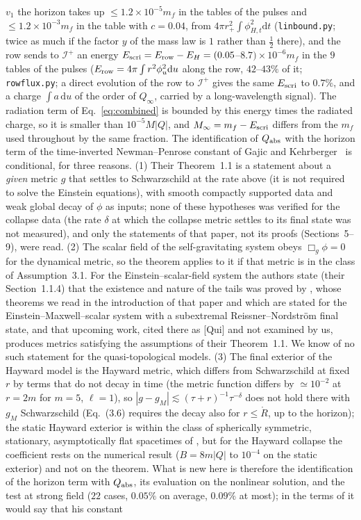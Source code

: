 \documentclass[11pt]{article}
\begin{document}
$v_1$ the horizon takes up $\le1.2\times10^{-5}m_f$ in the tables of the pulses and $\le1.2\times10^{-3}m_f$ in the table with $c=0.04$, from $4\pi r_+^{2}\int\phi_{H,t}^{2}\mathrm dt$ (\texttt{linbound.py}; twice as much if the factor $y$ of the mass law is $1$ rather than $\tfrac12$ there), and the row sends to $\mathcal I^{+}$ an energy $E_{\rm scri}=E_{\rm row}-E_H=(0.05$--$8.7)\times10^{-6}m_f$ in the $9$ tables of the pulses ($E_{\rm row}=4\pi\int r^{2}\phi_u^{2}\mathrm du$ along the row, $42$--$43\%$ of it; \texttt{rowflux.py}; a direct evolution of the row to $\mathcal I^{+}$ gives the same $E_{\rm scri}$ to $0.7\%$, and a charge $\int a\,\mathrm du$ of the order of $Q_\infty$, carried by a long-wavelength signal). The radiation term of Eq.~\eqref{eq:combined} is bounded by this energy times the radiated charge, so it is smaller than $10^{-5}M|Q|$, and $M_\infty=m_f-E_{\rm scri}$ differs from the $m_f$ used throughout by the same fraction. The identification of $Q_{\rm abs}$ with the horizon term of the time-inverted Newman--Penrose constant of Gajic and Kehrberger~\citeyearpar{GajicKehrberger2025} is conditional, for three reasons. (1) Their Theorem~1.1 is a statement about a \emph{given} metric $g$ that settles to Schwarzschild at the rate above (it is not required to solve the Einstein equations), with smooth compactly supported data and weak global decay of $\phi$ as inputs; none of these hypotheses was verified for the collapse data (the rate $\delta$ at which the collapse metric settles to its final state was not measured), and only the statements of that paper, not its proofs (Sections~5--9), were read. (2) The scalar field of the self-gravitating system obeys $\Box_g\phi=0$ for the dynamical metric, so the theorem applies to it if that metric is in the class of Assumption~3.1. For the Einstein--scalar-field system the authors state (their Section~1.1.4) that the existence and nature of the tails was proved by \citet{Gautam2024}, whose theorems we read in the introduction of that paper and which are stated for the Einstein--Maxwell--scalar system with a subextremal Reissner--Nordstr\"om final state, and that upcoming work, cited there as [Qui] and not examined by us, produces metrics satisfying the assumptions of their Theorem~1.1. We know of no such statement for the quasi-topological models. (3) The final exterior of the Hayward model is the Hayward metric, which differs from Schwarzschild at fixed $r$ by terms that do not decay in time (the metric function differs by $\simeq10^{-2}$ at $r=2m$ for $m=5$, $\ell=1$), so $|g-g_M|\lesssim(\tau+r)^{-1}\tau^{-\delta}$ does not hold there with $g_M$ Schwarzschild (Eq.~(3.6) requires the decay also for $r\le\mathring R$, up to the horizon); the static Hayward exterior is within the class of spherically symmetric, stationary, asymptotically flat spacetimes of \citet{AngelopoulosAretakisGajic2018}, but for the Hayward collapse the coefficient rests on the numerical result ($B=8m|Q|$ to $10^{-4}$ on the static exterior) and not on the theorem. What is new here is therefore the identification of the horizon term with $Q_{\rm abs}$, its evaluation on the nonlinear solution, and the test at strong field ($22$ cases, $0.05\%$ on average, $0.09\%$ at most); in the terms of \citet{Gautam2024} it would say that his constant 
\end{document}
